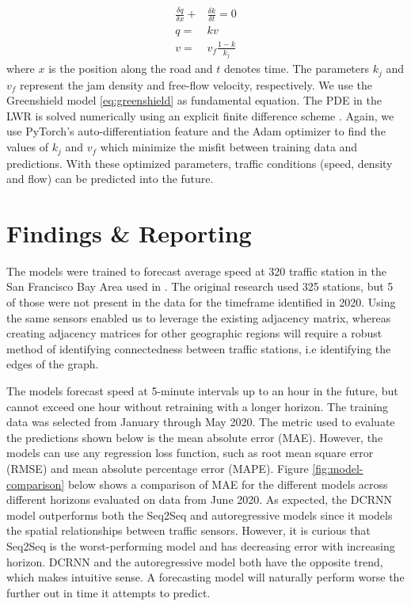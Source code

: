 \documentclass{article}
\begin{document}
\begin{align}
    \frac{\delta q}{\delta x} + & \frac{\delta k}{\delta t} = 0 \\
    q =& k v \\
    v =& v_f \frac{1-k}{k_j} \label{eq:greenshield}
\end{align}
where $x$ is the position along the road and $t$ denotes time.  
The parameters $k_j$ and $v_f$ represent the jam density and free-flow
velocity, respectively.
We use the Greenshield model \ref{eq:greenshield} as fundamental equation. The PDE in the LWR is solved numerically using an explicit finite difference scheme \cite{gaddam2016comparison}.  Again, we use PyTorch's auto-differentiation feature and the Adam optimizer to find the values of $k_j$ and $v_f$ which minimize the misfit between training data and predictions.  With these optimized parameters, traffic conditions (speed, density and flow) can be predicted into the future.

\section{Findings \& Reporting}

The models were trained to forecast average speed at 320 traffic station in the San Francisco Bay Area used in \cite{li2018dcrnn_traffic}. The original research used 325 stations, but 5 of those were not present in the data for the timeframe identified in 2020. Using the same sensors enabled us to leverage the existing adjacency matrix, whereas creating adjacency matrices for other geographic regions will require a robust method of identifying connectedness between traffic stations, i.e identifying the edges of the graph.

The models forecast speed at 5-minute intervals up to an hour in the future, but cannot exceed one hour without retraining with a longer horizon. The training data was selected from January through May 2020. The metric used to evaluate the predictions shown below is the mean absolute error (MAE). However, the models can use any regression loss function, such as root mean square error (RMSE) and mean absolute percentage error (MAPE). Figure \ref{fig:model-comparison} below shows a comparison of MAE for the different models across different horizons evaluated on data from June 2020. As expected, the DCRNN model outperforms both the Seq2Seq and autoregressive models since it models the spatial relationships between traffic sensors. However, it is curious that Seq2Seq is the worst-performing model and has decreasing error with increasing horizon. DCRNN and the autoregressive model both have the opposite trend, which makes intuitive sense. A forecasting model will naturally perform worse the further out in time it attempts to predict.
\end{document}
